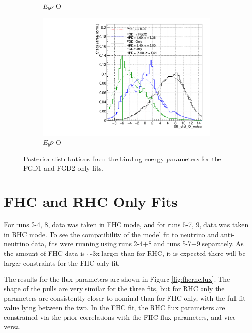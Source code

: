 \begin{figure}
\begin{subfigure}{.48\textwidth}
  \caption{$E_{b}\nu$ O}
\end{subfigure}
\begin{subfigure}{.48\textwidth}
  \centering
  \includegraphics[width=0.73\linewidth]{figs/FGD_EB_dial_O_nubar}
  \caption{$E_{b}\bar{\nu}$ O}
\end{subfigure}
\caption{Posterior distributions from the binding energy parameters for the FGD1 and FGD2 only fits.}
\label{fig:FGDEbdata}
\end{figure}

\section{FHC and RHC Only Fits}

For runs 2-4, 8, data was taken in FHC mode, and for runs 5-7, 9, data was taken in RHC mode. To see the compatibility of the model fit to neutrino and anti-neutrino data, fits were running using runs 2-4+8 and runs 5-7+9 separately. As the amount of FHC data is $\sim$3x 
larger than for RHC, it is expected there will be larger constraints for the FHC only fit.

The results for the flux parameters are shown in Figure \ref{fig:fhcrhcflux}. The shape of the pulls are very similar for the three fits, but for RHC only the parameters are consistently closer to nominal than for FHC only, with the full fit value lying between the two. In the FHC fit, the RHC flux parameters are constrained via the prior correlations with the FHC flux parameters, and vice versa.

